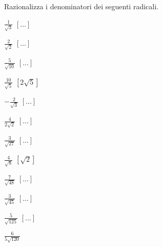 

\subsubsection*{}

\begin{esercizio}[\Ast]
 \label{ese:2.68}
Razionalizza i denominatori dei seguenti radicali.
 \begin{multicols}{4}
 \begin{enumeratea}
 \item $\frac 1{\sqrt 3}$
  \hfill $\left[...\right]$
 \item $\frac 2{\sqrt 2}$
  \hfill $\left[...\right]$
 \item $\frac 5{\sqrt{10}}$
  \hfill $\left[...\right]$
 \item $\frac{10}{\sqrt 5}$
  \hfill $\left[2\sqrt 5\right]$
 \item $-\frac 2{\sqrt 3}$
  \hfill $\left[...\right]$
 \item $\frac 4{2\sqrt 2}$
  \hfill $\left[...\right]$
 \item $\frac 3{\sqrt{27}}$
  \hfill $\left[...\right]$
 \item $\frac 4{\sqrt 8}$
  \hfill $\left[\sqrt 2\right]$
 \item $\frac 7{\sqrt{48}}$
  \hfill $\left[...\right]$
 \item $\frac 3{\sqrt{45}}$
  \hfill $\left[...\right]$
 \item $\frac 5{\sqrt{125}}$
  \hfill $\left[...\right]$
 \item $\frac 6{5\sqrt{120}}$

\end{enumeratea}
\end{multicols}
\end{esercizio}
